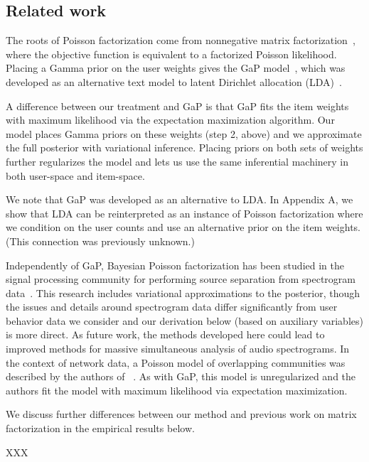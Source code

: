 \subsection{Related work}

The roots of Poisson factorization come from nonnegative matrix
factorization~\cite{Lee:1999}, where the objective function is
equivalent to a factorized Poisson likelihood.  Placing a Gamma prior
on the user weights gives the GaP model~\cite{Canny:2004}, which was
developed as an alternative text model to latent Dirichlet allocation
(LDA)~\cite{Blei:2003b}.

A difference between our treatment and GaP is that GaP fits the item
weights with maximum likelihood via the expectation maximization
algorithm.  Our model places Gamma priors on these weights (step 2,
above) and we approximate the full posterior with variational
inference.  Placing priors on both sets of weights further regularizes
the model and lets us use the same inferential machinery in both
user-space and item-space.  


We note that GaP was developed as an alternative to LDA. In Appendix
A, we show that LDA can be reinterpreted as an instance of Poisson
factorization where we condition on the user counts and use an
alternative prior on the item weights.  (This connection was
previously unknown.)

Independently of GaP, Bayesian Poisson factorization has been studied
in the signal processing community for performing source separation
from spectrogram data~\cite{Cemgil:2009,Hoffman:2012}.  This research
includes variational approximations to the posterior, though the
issues and details around spectrogram data differ significantly from
user behavior data we consider and our derivation below (based on
auxiliary variables) is more direct.  As future work, the methods
developed here could lead to improved methods for massive simultaneous
analysis of audio spectrograms. In the context of network data, a
Poisson model of overlapping communities was described by the authors
of ~\cite{Ball:2011}. As with GaP, this model is unregularized and the
authors fit the model with maximum likelihood via expectation
maximization.

We discuss further differences between our method and previous work on
matrix factorization in the empirical results below.

XXX \cite{Marlin:2009,Marlin:2012,Elkan:2008}
